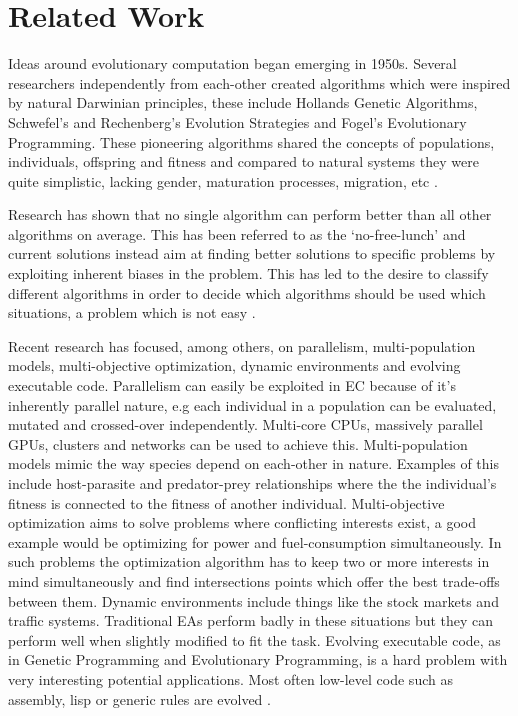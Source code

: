 \section{Related Work}

Ideas around evolutionary computation began emerging in 1950s. Several researchers independently from each-other created algorithms which were inspired by natural Darwinian principles, these include Hollands Genetic Algorithms, Schwefel's and Rechenberg's Evolution Strategies and Fogel's Evolutionary Programming. These pioneering algorithms shared the concepts of populations, individuals, offspring and fitness and compared to natural systems they were quite simplistic, lacking gender, maturation processes, migration, etc \cite{dejong2009EC}.

Research has shown that no single algorithm can perform better than all other algorithms on average. This has been referred to as the `no-free-lunch' and current solutions instead aim at finding better solutions to specific problems by exploiting inherent biases in the problem. This has led to the desire to classify different algorithms in order to decide which algorithms should be used which situations, a problem which is not easy \cite{dejong2009EC}.

Recent research has focused, among others, on parallelism, multi-population models, multi-objective optimization, dynamic environments and evolving executable code. Parallelism can easily be exploited in EC because of it's inherently parallel nature, e.g each individual in a population can be evaluated, mutated and crossed-over independently. Multi-core CPUs, massively parallel GPUs, clusters and networks can be used to achieve this. Multi-population models mimic the way species depend on each-other in nature. Examples of this include host-parasite and predator-prey relationships where the the individual's fitness is connected to the fitness of another individual. Multi-objective optimization aims to solve problems where conflicting interests exist, a good example would be optimizing for power and fuel-consumption simultaneously. In such problems the optimization algorithm has to keep two or more interests in mind simultaneously and find intersections points which offer the best trade-offs between them. Dynamic environments include things like the stock markets and traffic systems. Traditional EAs perform badly in these situations but they can perform well when slightly modified to fit the task. Evolving executable code, as in Genetic Programming and Evolutionary Programming, is a hard problem with very interesting potential applications. Most often low-level code such as assembly, lisp or generic rules are evolved \cite{dejong2009EC}.

